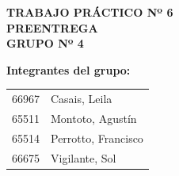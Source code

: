 \begin{center}
    
    {\large \textbf{TRABAJO PRÁCTICO Nº 6}}\\[0.5cm]
    
    {\Large \textbf{PREENTREGA }}\\[1cm]
    
    {\normalsize \textbf{GRUPO Nº 4}}\\[0.5cm]

\end{center}

\vspace{0.5cm}

\textbf{Integrantes del grupo:}

\vspace{0.3cm}

\begin{tabular}{p{5cm} p{8cm}}
66967 & Casais, Leila \\
65511 & Montoto, Agustín \\
65514 & Perrotto, Francisco \\
66675 & Vigilante, Sol \\
\end{tabular}

\vspace{0.8cm}

\vspace{1cm}

\newpage